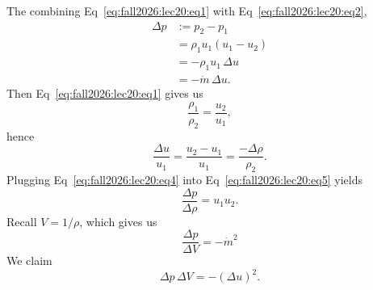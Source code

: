 \begin{node}
The combining Eq~\eqref{eq:fall2026:lec20:eq1} with Eq~\eqref{eq:fall2026:lec20:eq2},
\begin{subequations}\label{eq:fall2026:lec20:eq4}
  \begin{align}
\Delta p &:= p_{2}-p_{1} \\
&=\rho_{1}u_{1}(u_{1}-u_{2})\\
&=-\rho_{1}u_{1}\,\Delta u\\
&=-\dot{m}\,\Delta u.
  \end{align}
\end{subequations}
Then Eq~\eqref{eq:fall2026:lec20:eq1} gives us
\begin{equation}
\frac{\rho_{1}}{\rho_{2}}=\frac{u_{2}}{u_{1}},
\end{equation}
hence
\begin{equation}\label{eq:fall2026:lec20:eq5}
\frac{\Delta u}{u_{1}}=\frac{u_{2}-u_{1}}{u_{1}}=\frac{-\Delta\rho}{\rho_{2}}.
\end{equation}
Plugging Eq~\eqref{eq:fall2026:lec20:eq4} into Eq~\eqref{eq:fall2026:lec20:eq5}
yields
\begin{equation}\label{eq:fall2026:lec20:eq6}
\frac{\Delta p}{\Delta\rho}=u_{1}u_{2}.
\end{equation}
Recall $V=1/\rho$, which gives us
\begin{equation}\label{eq:fall2026:lec20:eq7}
\frac{\Delta p}{\Delta V}=-\dot{m}^{2}
\end{equation}
We claim
\begin{equation}\label{eq:fall2026:lec20:eq8}
\Delta p\,\Delta V=-(\Delta u)^{2}.
\end{equation}
\end{node}

